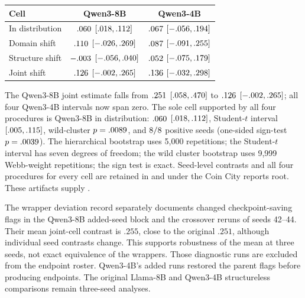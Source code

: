 \begin{center}
\begin{minipage}{\linewidth}
\centering
{}
\label{tab:exp3-eight-seed}
\small
\setlength{\tabcolsep}{5pt}
\begin{tabular}{lcc}
\toprule
Cell & Qwen3-8B & Qwen3-4B \\
\midrule
In distribution & $.060{}$ $[.018,.112]{}$ & $.067{}$ $[-.056,.194]{}$ \\
Domain shift & $.110{}$ $[-.026,.269]{}$ & $.087{}$ $[-.091,.255]{}$ \\
Structure shift & $-.003{}$ $[-.056,.040]{}$ & $.052{}$ $[-.075,.179]{}$ \\
Joint shift & $.126{}$ $[-.002,.265]{}$ & $.136{}$ $[-.032,.298]{}$ \\
\bottomrule
\end{tabular}
\end{minipage}
\end{center}

The Qwen3-8B joint estimate falls from $.251{}$
$[.058,.470]{}$ to $.126{}$ $[-.002,.265]{}$; all four
Qwen3-4B intervals now span zero. The sole cell supported by all four procedures
is Qwen3-8B in distribution: $.060{}$ $[.018,.112]{}$, Student-$t$
interval $[.005,.115]{}$, wild-cluster $p=.0089{}$, and
$8/8{}$ positive seeds (one-sided sign-test $p=.0039{}$).
The hierarchical bootstrap uses 5,000 repetitions; the Student-$t$ interval has
seven degrees of freedom; the wild cluster bootstrap uses 9,999 Webb-weight
repetitions; the sign test is exact. Seed-level contrasts and all four
procedures for every cell are retained in
 and
 under the Coin City reports
root. These artifacts supply .

The wrapper deviation record separately documents changed checkpoint-saving
flags in the Qwen3-8B added-seed block and the crossover reruns of seeds 42--44.
Their mean joint-cell contrast is $.255$, close to the original $.251$, although
individual seed contrasts change. This supports robustness of the mean at three
seeds, not exact equivalence of the wrappers. Those diagnostic runs are excluded
from the endpoint roster. Qwen3-4B's added
runs restored the parent flags before producing endpoints. The original
Llama-8B and Qwen3-4B structureless comparisons remain three-seed analyses.


